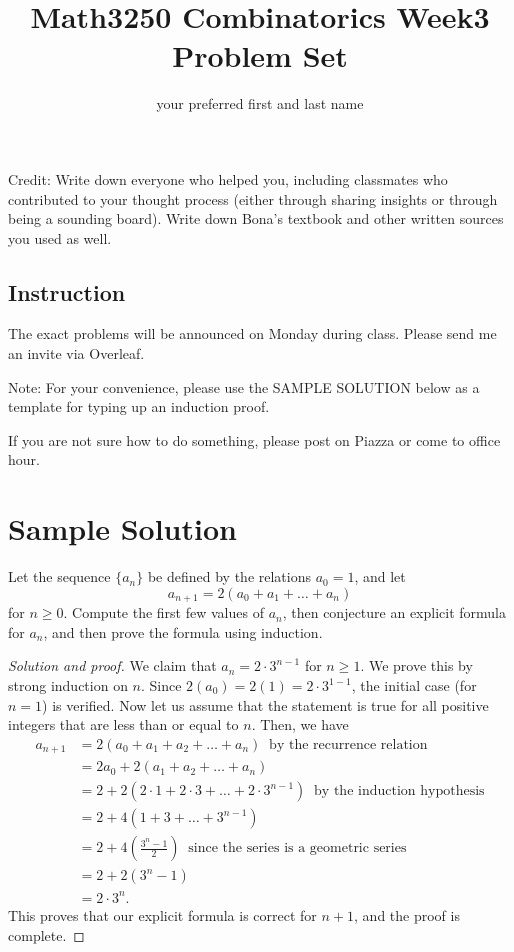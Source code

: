 \documentclass[12pt]{amsart}
\title{Math3250 Combinatorics Week3 Problem Set}
\author{your preferred first and last name}
\date{}
\begin{document}
\maketitle


\noindent Credit: Write down everyone who helped you, including classmates who contributed to your thought process (either through sharing insights or through being a sounding board). Write down Bona's textbook and other written sources you used as well.

\subsection*{Instruction}
The exact problems will be announced on Monday during class. 
Please send me an invite via Overleaf. %

Note: For your convenience, please use the SAMPLE SOLUTION below as a template for typing up an induction proof. 

If you are not sure how to do something, please post on Piazza or come to office hour.


\section*{Sample Solution}
Let the sequence $\{ a_n\}$ be defined by the relations $a_0=1$, and let
\[
a_{n+1} = 2(a_0 + a_1 + \dots + a_n) 
\]
for $n \geq 0$. 
Compute the first few values of $a_n$, then conjecture an explicit formula for $a_n$, and then prove the formula using induction.
\begin{proof}[Solution and proof]
We claim that $a_n = 2 \cdot 3^{n-1}$ for $n \geq 1$. We prove this by strong induction on $n$.
Since $2(a_0)=2(1)=2\cdot 3^{1-1}$, the initial case (for $n=1$) is verified.  
Now let us assume that the statement is true for all positive integers that are less than or equal to $n$. Then, we have
\begin{align*}
    a_{n+1} &= 2(a_0 + a_1 + a_2 + \dots + a_n) ~ \text{ by the recurrence relation}\\
    &= 2 a_0 + 2 (a_1 + a_2 + \dots +  a_n)\\
    &= 2 + 2(2 \cdot 1 + 2 \cdot 3 + \dots + 2 \cdot 3^{n-1}) ~ \text{ by the induction hypothesis}\\
     &= 2 + 4 ( 1 +  3 + \dots +  3^{n-1})\\
     &= 2 + 4 \left( \frac{3^n - 1}{2}  \right) ~ \text{ since the series is a geometric series} \\
     &= 2 + 2 (3^n - 1) \\
     &= 2 \cdot 3^n.
\end{align*}
This proves that our explicit formula is correct for $n+1$, and the proof is complete.
\end{proof}
\end{document}
